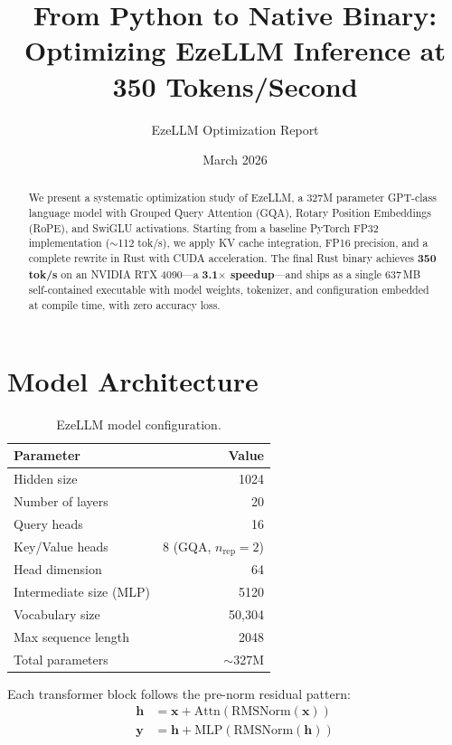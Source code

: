 \documentclass[11pt,a4paper]{article}
\title{%
    \textbf{From Python to Native Binary:\\
    Optimizing EzeLLM Inference at 350 Tokens/Second}
}
\author{
    EzeLLM Optimization Report
}
\date{March 2026}
\begin{document}
\maketitle

\begin{abstract}
We present a systematic optimization study of EzeLLM, a 327M parameter
GPT-class language model with Grouped Query Attention (GQA), Rotary
Position Embeddings (RoPE), and SwiGLU activations.
Starting from a baseline PyTorch FP32 implementation ($\sim$112 tok/s),
we apply KV cache integration, FP16 precision, and a complete rewrite
in Rust with CUDA acceleration.
The final Rust binary achieves \textbf{350 tok/s} on an NVIDIA RTX 4090---a
\textbf{3.1$\times$ speedup}---and ships as a single 637\,MB self-contained
executable with model weights, tokenizer, and configuration embedded at
compile time, with zero accuracy loss.
\end{abstract}

\section{Model Architecture}

\begin{table}[H]
\centering
\caption{EzeLLM model configuration.}
\label{tab:config}
\begin{tabular}{lr}
\toprule
\textbf{Parameter} & \textbf{Value} \\
\midrule
Hidden size & 1024 \\
Number of layers & 20 \\
Query heads & 16 \\
Key/Value heads & 8 (GQA, $n_\text{rep}=2$) \\
Head dimension & 64 \\
Intermediate size (MLP) & 5120 \\
Vocabulary size & 50{,}304 \\
Max sequence length & 2048 \\
Total parameters & $\sim$327M \\
\bottomrule
\end{tabular}
\end{table}

Each transformer block follows the pre-norm residual pattern:
\begin{align}
    \mathbf{h} &= \mathbf{x} + \text{Attn}(\text{RMSNorm}(\mathbf{x})) \\
    \mathbf{y} &= \mathbf{h} + \text{MLP}(\text{RMSNorm}(\mathbf{h}))
\end{align}
\end{document}
